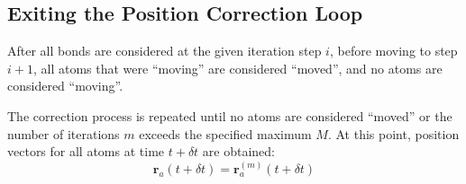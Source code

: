 \subsection{Exiting the Position Correction Loop}
\label{sec:terminating-loop}
\par After all bonds are considered at the given iteration step $i$, before moving to step $i + 1$, all atoms that were  ``moving'' are considered ``moved'', and no atoms are considered ``moving''.
\par The correction process is repeated until no atoms are considered ``moved'' or the number of iterations $m$ exceeds the specified maximum $M$. At this point, position vectors for all atoms at time $t + \delta t$ are obtained:
\begin{equation}
	\mathbf{r}_a(t + \delta t) = \mathbf{r}^{(m)}_{a}(t + \delta t)
\end{equation}
